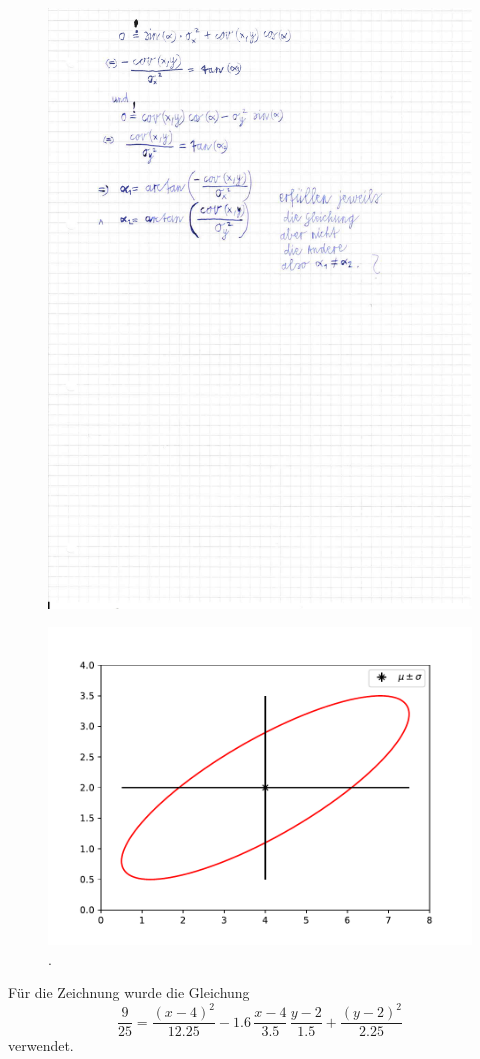 \documentclass[
  bibliography=totoc,     %
  captions=tableheading,  %
  titlepage=firstiscover, %
]{scrartcl}
\begin{document}
  \begin{figure}[H]
    \centering
    \includegraphics[width=\textwidth]{IMG_20181101_0003.pdf}
  \end{figure}
  \begin{figure}[H]
    \centering
    \includegraphics[width=\textwidth]{plotc.pdf}
    \caption{.}
    \label{fig:1}
  \end{figure}
  Für die Zeichnung wurde die Gleichung
  \begin{equation}
    \frac{9}{25} = \frac{\left( x-4 \right)^2}{12.25} - 1.6\,\frac{x-4}{3.5}\,\frac{y-2}{1.5} + \frac{\left( y-2 \right)^2}{2.25}
  \end{equation}
  verwendet.
\end{document}
